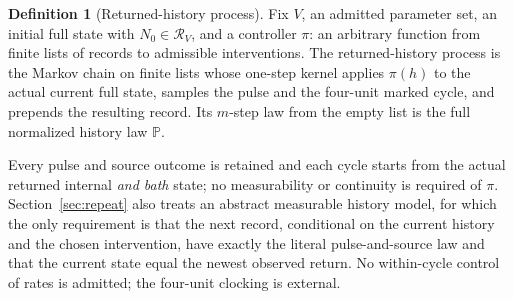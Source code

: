 \documentclass[11pt,a4paper]{article}
\theoremstyle{plain}
\theoremstyle{definition}
\newtheorem{definition}[theorem]{Definition}
\theoremstyle{remark}
\newcommand{\Prob}{\mathbb P}
\newcommand{\cR}{\mathcal R}
\begin{document}
\begin{definition}[Returned-history process]\label{def:process}
Fix $V$, an admitted parameter set, an initial full state with $N_0\in\cR_V$, and a controller $\pi$: an arbitrary function from finite lists of records to admissible interventions. The returned-history process is the Markov chain on finite lists whose one-step kernel applies $\pi(h)$ to the actual current full state, samples the pulse and the four-unit marked cycle, and prepends the resulting record. Its $m$-step law from the empty list is the full normalized history law $\Prob$.
\end{definition}
Every pulse and source outcome is retained and each cycle starts from the actual returned internal \emph{and bath} state; no measurability or continuity is required of $\pi$. Section~\ref{sec:repeat} also treats an abstract measurable history model, for which the only requirement is that the next record, conditional on the current history and the chosen intervention, have exactly the literal pulse-and-source law and that the current state equal the newest observed return. No within-cycle control of rates is admitted; the four-unit clocking is external.
\end{document}

